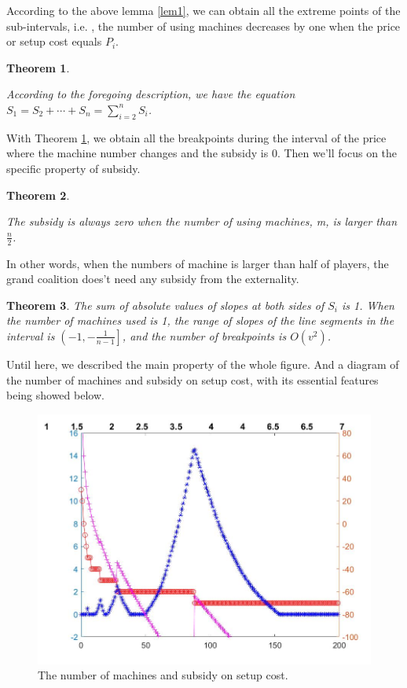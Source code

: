 \documentclass[UTF8]{article}
\newtheorem{thm}{\hspace{2em}Theorem}
\begin{document}
According to the above lemma \ref{lem1}, we can obtain all the extreme points of the sub-intervals, i.e. , the number of using machines decreases by one when the price or setup cost equals $P_i$.


\begin{thm}\label{thm2}

According to the foregoing description, we have the equation $S_{1}=S_{2}+\cdots+S_{n}=\sum_{i=2}^n S_i$.

\end{thm}

With Theorem \ref{thm2}, we obtain all the breakpoints during the interval of the price where the machine number changes and the subsidy is $0$. Then we'll focus on the specific property of subsidy.

\begin{thm}\label{thm3}

The subsidy is always zero when the number of using machines, m, is larger than $\frac{n}{2}$.

\end{thm}

In other words, when the numbers of machine is larger than half of players, the grand coalition does't need any subsidy from the externality.

\begin{thm}\label{thm4}
The sum of absolute values of slopes at both sides of $S_i$ is 1.
When the number of machines used is 1, the range of slopes of the line segments in the interval is $\left( -1 , -\frac{1}{n-1} \right]$, and the number of breakpoints is $ O(v^2) $.
\end{thm}

Until here, we described the main property of the whole figure.
And a diagram of the number of machines and subsidy on setup cost, with its essential features being showed below.

\begin{figure}[h]%
	\centering  %
	\includegraphics[width=0.8\linewidth]{Figures/Image30}  %
	\caption{The number of machines and subsidy on setup cost.}  %
	\label{fig:Image11}   %
\end{figure}
\end{document}
